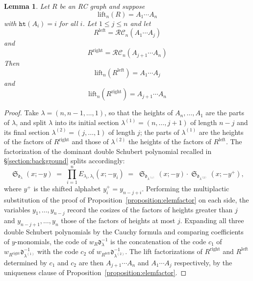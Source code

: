 \documentclass{amsart}
\newtheorem{lemma}{Lemma}[subsection]
\theoremstyle{definition}
\theoremstyle{remark}
\numberwithin{equation}{subsection}
\DeclareMathOperator{\sch}{\mathfrak{S}}
\newcommand{\wof}[1]{w_{#1}}
\newcommand{\hr}{\mathtt{ht}}
\newcommand{\RC}{\mathcal{RC}}
\newcommand{\dom}{\mathfrak{d}}
\begin{document}
\begin{lemma}
  Let $R$ be an RC graph and suppose
$$\mathrm{lift}_n(R) = A_1\cdots A_n$$
with $\hr(A_i) = i$ for all $i$. Let $1\leq j\leq n$ and let 
$$R^{\mathrm{left}} = \RC_n(A_1\cdots  A_j)$$
and
$$R^{\mathrm{right}} = \RC_n(A_{j+1}\cdots  A_n)$$
Then
$$\mathrm{lift}_n(R^{\mathrm{left}}) = A_1\cdots  A_j$$
and
$$\mathrm{lift}_n(R^{\mathrm{right}}) = A_{j+1}\cdots  A_n$$
\end{lemma}
\begin{proof}
Take $\lambda=(n,n-1,\ldots,1)$, so that the heights of $A_n,\ldots,A_1$ are the parts of $\lambda$, and split $\lambda$ into its initial section $\lambda^{(1)}=(n,\ldots,j+1)$ of length $n-j$ and its final section $\lambda^{(2)}=(j,\ldots,1)$ of length $j$; the parts of $\lambda^{(1)}$ are the heights of the factors of $R^{\mathrm{right}}$ and those of $\lambda^{(2)}$ the heights of the factors of $R^{\mathrm{left}}$. The factorization of the dominant double Schubert polynomial recalled in \S\ref{section:background} \cite[(6.14)]{notes} splits accordingly:
$$\sch_{\dom_\lambda}(x;-y)\;=\;\prod_{i=1}^{n}E_{\lambda_i,\lambda_i}(x;-y_i)\;=\;\sch_{\dom_{\lambda^{(1)}}}(x;-y)\cdot\sch_{\dom_{\lambda^{(2)}}}(x;-y^{+}),$$
where $y^{+}$ is the shifted alphabet $y^{+}_i=y_{n-j+i}$. Performing the multiplactic substitution of the proof of Proposition~\ref{proposition:elemfactor} on each side, the variables $y_1,\ldots,y_{n-j}$ record the cosizes of the factors of heights greater than $j$ and $y_{n-j+1},\ldots,y_n$ those of the factors of heights at most $j$. Expanding all three double Schubert polynomials by the Cauchy formula and comparing coefficients of $y$-monomials, the code of $\wof{R}\dom_\lambda^{-1}$ is the concatenation of the code $c_1$ of $\wof{R^{\mathrm{right}}}\dom_{\lambda^{(1)}}^{-1}$ with the code $c_2$ of $\wof{R^{\mathrm{left}}}\dom_{\lambda^{(2)}}^{-1}$. The lift factorizations of $R^{\mathrm{right}}$ and $R^{\mathrm{left}}$ determined by $c_1$ and $c_2$ are then $A_{j+1}\cdots A_n$ and $A_1\cdots A_j$ respectively, by the uniqueness clause of Proposition~\ref{proposition:elemfactor}.
\end{proof}
\end{document}
